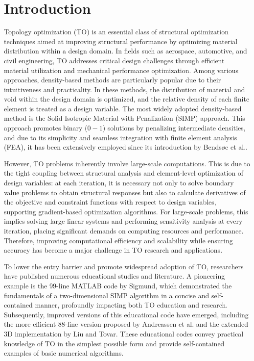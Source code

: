 \documentclass[mathpazo]{cicp}
\begin{document}
\maketitle


\section{Introduction}
Topology optimization (TO) is an essential class of structural optimization techniques aimed at improving structural performance by optimizing material distribution within a design domain. In fields such as aerospace, automotive, and civil engineering, TO addresses critical design challenges through efficient material utilization and mechanical performance optimization. Among various approaches, density-based methods are particularly popular due to their intuitiveness and practicality. In these methods, the distribution of material and void within the design domain is optimized, and the relative density of each finite element is treated as a design variable. The most widely adopted density-based method is the Solid Isotropic Material with Penalization (SIMP) approach. This approach promotes binary ($0-1$) solutions by penalizing intermediate densities, and due to its simplicity and seamless integration with finite element analysis (FEA), it has been extensively employed since its introduction by Bendsøe et al.\cite{Bendsøe2004}.

However, TO problems inherently involve large-scale computations. This is due to the tight coupling between structural analysis and element-level optimization of design variables: at each iteration, it is necessary not only to solve boundary value problems to obtain structural responses but also to calculate derivatives of the objective and constraint functions with respect to design variables, supporting gradient-based optimization algorithms. For large-scale problems, this implies solving large linear systems and performing sensitivity analysis at every iteration, placing significant demands on computing resources and performance. Therefore, improving computational efficiency and scalability while ensuring accuracy has become a major challenge in TO research and applications.

To lower the entry barrier and promote widespread adoption of TO, researchers have published numerous educational studies and literature. A pioneering example is the 99-line MATLAB code by Sigmund\cite{sigmund200199}, which demonstrated the fundamentals of a two-dimensional SIMP algorithm in a concise and self-contained manner, profoundly impacting both TO education and research. Subsequently, improved versions of this educational code have emerged, including the more efficient 88-line version proposed by Andreassen et al.\cite{andreassen2011efficient} and the extended 3D implementation by Liu and Tovar\cite{liu2014efficient}. These educational codes convey practical knowledge of TO in the simplest possible form and provide self-contained examples of basic numerical algorithms.
\end{document}
